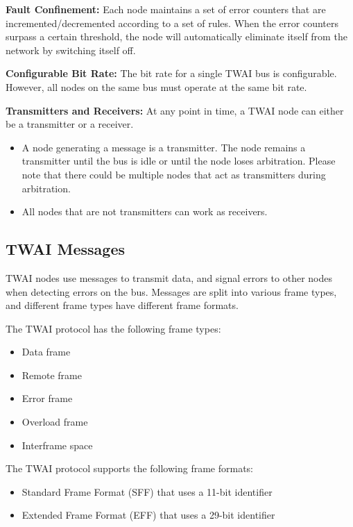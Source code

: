 \documentclass[main\_\_EN.tex]{subfiles}
\begin{document}
{\bfseries Fault Confinement:} Each node maintains a set of error counters that are incremented/decremented according to a set of rules. When the error counters surpass a certain threshold, the node will automatically eliminate itself from the network by switching itself off.

{\bfseries
Configurable Bit Rate:} The bit rate for a single TWAI bus is configurable. However, all nodes on the same bus must operate at the same bit rate.

{\bfseries Transmitters and Receivers:} At any point in time, a TWAI node can either be a transmitter or a receiver.
\begin{itemize}
    \item A node generating a message is a transmitter. The node remains a transmitter until the bus is idle or until the node loses arbitration. Please note that there could be multiple nodes that act as transmitters during arbitration.
    \item All nodes that are not transmitters can work as receivers.
\end{itemize}

\subsection{TWAI Messages}
\label{sec:twai-messages}

TWAI nodes use messages to transmit data, and signal errors to other nodes when detecting errors on the bus. Messages are split into various frame types, and different frame types have different frame formats.

The TWAI protocol has the following frame types:

\begin{itemize}
    \item Data frame
    \item Remote frame
    \item Error frame
    \item Overload frame
    \item Interframe space
\end{itemize}

The TWAI protocol supports the following frame formats:

\begin{itemize}
    \item Standard Frame Format (SFF) that uses a 11-bit identifier
    \item Extended Frame Format (EFF) that uses a 29-bit identifier
\end{itemize}
\end{document}
